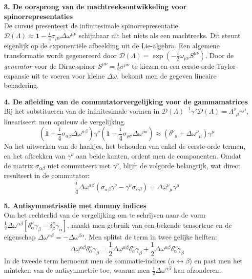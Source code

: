 \documentclass[a4paper,twoside]{article}
\theoremstyle{definition}
\theoremstyle{plain}
\begin{document}
\textbf{3. De oorsprong van de machtreeksontwikkeling voor spinorrepresentaties} \\
De cursus presenteert de infinitesimale spinorrepresentatie $\mathcal{D}(\Lambda) \approx \mathbf{1} - \frac{i}{4} \sigma_{\mu\nu} \Delta\omega^{\mu\nu}$ schijnbaar uit het niets als een machtreeks. Dit steunt eigenlijk op de exponentiële afbeelding uit de Lie-algebra. Een algemene transformatie wordt gegenereerd door $\mathcal{D}(\Lambda) = \exp(-\frac{i}{2} \omega_{\mu\nu} S^{\mu\nu})$. Door de \textit{generator} voor de Dirac-spinor $S^{\mu\nu} = \frac{1}{2}\sigma^{\mu\nu}$ te kiezen en een eerste-orde Taylor-expansie uit te voeren voor kleine $\Delta\omega$, bekomt men de gegeven lineaire benadering.

\textbf{4. De afleiding van de commutatorvergelijking voor de gammamatrices} \\
Bij het substitueren van de infinitesimale vormen in $\mathcal{D}(\Lambda)^{-1} \gamma^\nu \mathcal{D}(\Lambda) = \Lambda^\nu_{\;\;\mu} \gamma^\mu$, lineariseert men opnieuw de vergelijking.
\begin{equation}
\left( \mathbf{1} + \frac{i}{4}\sigma_{\alpha\beta}\Delta\omega^{\alpha\beta} \right) \gamma^\nu \left( \mathbf{1} - \frac{i}{4}\sigma_{\rho\sigma}\Delta\omega^{\rho\sigma} \right) \approx \left( \delta^\nu_{\;\;\mu} + \Delta\omega^\nu_{\;\;\mu} \right) \gamma^\mu
\end{equation}
Na het uitwerken van de haakjes, het behouden van enkel de eerste-orde termen, en het aftrekken van $\gamma^\nu$ aan beide kanten, ordent men de componenten. Omdat de matrix $\sigma_{\alpha\beta}$ niet commuteert met $\gamma^\nu$, blijft de volgorde belangrijk, wat direct resulteert in de commutator:
\begin{equation}
\frac{i}{4}\Delta\omega^{\alpha\beta} (\sigma_{\alpha\beta} \gamma^\nu - \gamma^\nu \sigma_{\alpha\beta}) = \Delta\omega^\nu_{\;\;\mu} \gamma^\mu
\end{equation}

\textbf{5. Antisymmetrisatie met dummy indices} \\
Om het rechterlid van de vergelijking om te schrijven naar de vorm $\frac{1}{2} \Delta\omega^{\alpha\beta} [ \delta^\nu_\alpha \gamma_\beta - \delta^\nu_\beta \gamma_\alpha ]$, maakt men gebruik van een bekende tensortruc en de eigenschap $\Delta\omega^{\alpha\beta} = -\Delta\omega^{\beta\alpha}$. Men splitst de term in twee gelijke helften:
\begin{equation}
\Delta\omega^{\alpha\beta} \delta^\nu_\alpha \gamma_\beta = \frac{1}{2} \Delta\omega^{\alpha\beta} \delta^\nu_\alpha \gamma_\beta + \frac{1}{2} \Delta\omega^{\alpha\beta} \delta^\nu_\alpha \gamma_\beta
\end{equation}
In de tweede term hernoemt men de sommatie-indices ($\alpha \leftrightarrow \beta$) en past men het minteken van de antisymmetrie toe, waarna men $\frac{1}{2} \Delta\omega^{\alpha\beta}$ kan afzonderen.
\end{document}
